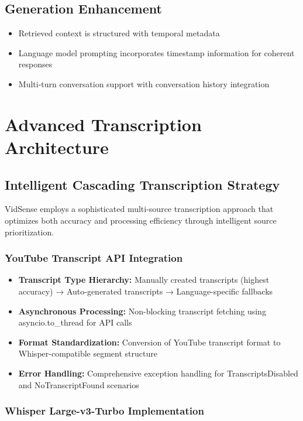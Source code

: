 \documentclass{bscs}
\begin{document}
\subsection{Generation Enhancement}

\begin{itemize}
\item Retrieved context is structured with temporal metadata
\item Language model prompting incorporates timestamp information for coherent responses
\item Multi-turn conversation support with conversation history integration
\end{itemize}

\section{Advanced Transcription Architecture}

\subsection{Intelligent Cascading Transcription Strategy}

VidSense employs a sophisticated multi-source transcription approach that optimizes both accuracy and processing efficiency through intelligent source prioritization.

\subsubsection{YouTube Transcript API Integration}

\begin{itemize}
\item \textbf{Transcript Type Hierarchy:} Manually created transcripts (highest accuracy) → Auto-generated transcripts → Language-specific fallbacks
\item \textbf{Asynchronous Processing:} Non-blocking transcript fetching using asyncio.to\_thread for API calls
\item \textbf{Format Standardization:} Conversion of YouTube transcript format to Whisper-compatible segment structure
\item \textbf{Error Handling:} Comprehensive exception handling for TranscriptsDisabled and NoTranscriptFound scenarios
\end{itemize}

\subsubsection{Whisper Large-v3-Turbo Implementation}
\end{document}
